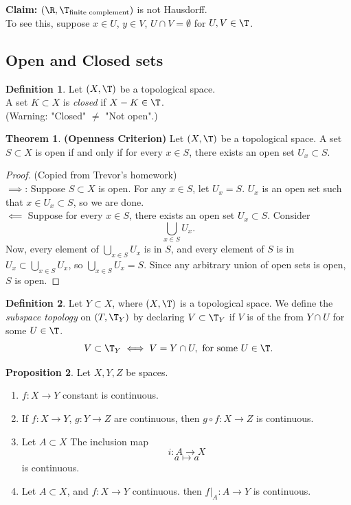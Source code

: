 \documentclass[a5paper]{article}
\theoremstyle{definition}%
\newtheorem{theorem}{Theorem}
\newtheorem{proposition}[theorem]{Proposition}
\newtheorem*{definition*}{Definition}
\numberwithin{exercise}{section}
\theoremstyle{remark}%
\begin{document}
\noindent \textbf{Claim:} $(\R, \T_{\text{finite complement}})$ is not Hausdorff. \\
To see this, suppose $x \in U$, $y \in V$, $U \cap V = \emptyset$ for $U,V \in \T$.

\subsection{Open and Closed sets}

\begin{definition*}
Let $(X, \T)$ be a topological space.\\
A set $K\subset X$ is \emph{closed} if $X-K\in \T$. \\
(Warning: "Closed" $\neq$ "Not open".) 
\end{definition*}

\begin{highlight}
\begin{theorem}
\textbf{(Openness Criterion)}
Let $(X, \T)$ be a topological space. A set $S \subset X$ is open if and only if for every $x \in S$, there exists an open set $U_x \subset S$. 
\end{theorem}
\end{highlight}
\begin{proof}(Copied from Trevor's homework)\\
$\implies$: Suppose $S \subset X$ is open. For any $x \in S$, let $U_x = S$. $U_x$ is an open set such that $x \in U_x \subset S$, so we are done. \qedwhite \\
$\impliedby$ Suppose for every $x \in S$, there exists an open set $U_x \subset S$. Consider 
$$\bigcup_{x\in S}U_x.$$
Now, every element of $\bigcup_{x\in S} U_x$ is in $S$, and every element of $S$ is in $U_x \subset \bigcup_{x\in S} U_x$, so $\bigcup_{x\in S} U_x = S$. Since any arbitrary union of open sets is open, $S$ is open. 
\end{proof}



\begin{definition*}
Let $Y \subset X$, where $(X,\T)$ is a topological space. We define the \emph{subspace topology} on $(T, \T_Y)$ by declaring $V \subset \T_Y$ if $V$ is of the from $Y\cap U$ for some $U \in \T$. 
$$V \subset \T_Y \iff V = Y\cap U, \text{ for some }U \in \T.$$ 
\end{definition*}

\begin{proposition} Let $X,Y,Z$ be spaces. 
\begin{enumerate}[label=(\alph*)]
\item $f:X\to Y$ constant is continuous. 
\item If $f:X\to Y$, $g:Y\to Z$ are continuous, then $g\circ f:X \to Z$ is continuous. 
\item Let $A \subset X$ The inclusion map
$$i:A \to X$$
$$a \mapsto a$$
is continuous. 
\item Let $A \subset X$, and $f:X\to Y$ continuous. then $f|_A:A \to Y$ is continuous. 
\end{enumerate}
\end{proposition}
\end{document}
